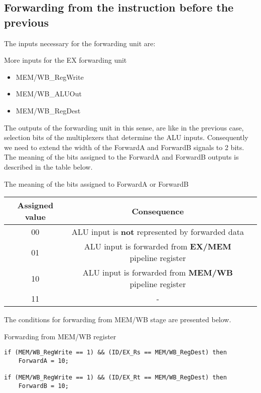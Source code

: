 \documentclass[a4paper,12pt]{report}
\begin{document}
\subsection{Forwarding from the instruction before the previous}
The inputs necessary for the forwarding unit are:
\begin{my-list}{More inputs for the EX forwarding unit}
    \begin{itemize}
        \item MEM/WB\_RegWrite
        \item MEM/WB\_ALUOut
        \item MEM/WB\_RegDest
    \end{itemize}
\end{my-list}
The outputs of the forwarding unit in this sense, are like in the previous case, selection bits of the multiplexers that determine the ALU inputs. Consequently we need to extend the width of the ForwardA and ForwardB signals to 2 bits.
The meaning of the bits assigned to the ForwardA and ForwardB outputs is described in the table below.

\begin{my-table}{The meaning of the bits assigned to ForwardA or ForwardB}
    \begin{center}
    \begin{tabular}{|c|c|c|}
        \hline
        \textbf{Assigned value} & \textbf{Consequence}\\
         \hline
         00 &  ALU input is \textbf{not} represented by forwarded data\\
        \hline
         01 &  ALU input is forwarded from \textbf{EX/MEM} pipeline register\\
        \hline
         10 &  ALU input is forwarded from \textbf{MEM/WB} pipeline register\\
        \hline
         11 &  -\\
        \hline
    \end{tabular}
    \end{center}
    \label{table:1}
\end{my-table}

The conditions for forwarding from MEM/WB stage are presented below.

\begin{my-listing}{Forwarding from MEM/WB register}
    \begin{lstlisting}[style=vhdl]
if (MEM/WB_RegWrite == 1) && (ID/EX_Rs == MEM/WB_RegDest) then
    ForwardA = 10;
    
if (MEM/WB_RegWrite == 1) && (ID/EX_Rt == MEM/WB_RegDest) then
    ForwardB = 10;
    \end{lstlisting}
\end{my-listing}
\end{document}
